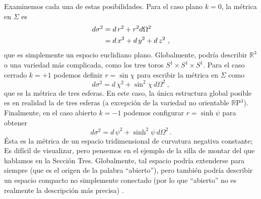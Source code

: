 \documentclass[11pt,b5paper,openany,twoside]{book}
\newcommand{\R}{\mathbb{R}}
\begin{document}
Examinemos cada una de estas posibilidades.
Para el caso plano $k=0$, la métrica en $\Sigma$ es
\begin{align}
d\sigma^2  &=   d\,r^2 + r^2 d\Omega^2 \notag \\
&=   d\,x^2 +  d\,y^2 + d\,z^2\ ,\label{8.9}
\end{align}
que es simplemente un espacio euclidiano plano.
Globalmente, podría describir $\R^3$ o una variedad más complicada, como los tres toros $S^1\times S^1 \times S^1$.
Para el caso cerrado $k=+1$ podemos definir $r=\sin\chi$ para escribir la métrica en $\Sigma$ como
\begin{equation}
d\sigma^2 =  d\,\chi^2 + \sin^2\chi\, d\Omega^2\ ,\label{8.10}
\end{equation}
que es la métrica de tres esferas.
En este caso, la única estructura global posible es en realidad la de tres esferas (a excepción de la variedad no orientable $\R$P$^3$).
Finalmente, en el caso abierto $k=-1$ podemos configurar $r=\sinh\psi$ para obtener
\begin{equation}
d\sigma^2 =  d\,\psi^2 + \sinh^2\psi\, d\Omega^2\,.\label{8.11}
\end{equation}
Ésta es la métrica de un espacio tridimensional de curvatura negativa constante; Es difícil de visualizar, pero pensemos en el ejemplo de la silla de montar del que hablamos en la Sección Tres.
Globalmente, tal espacio podría extenderse para siempre (que es el origen de la palabra ``abierto''), pero también podría describir un espacio compacto no simplemente conectado (por lo que ``abierto'' no es realmente la descripción más precisa) .
\end{document}
